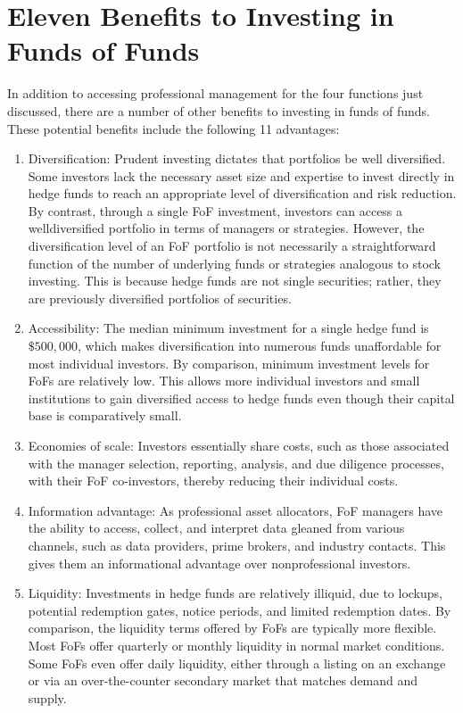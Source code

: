 \documentclass[11pt]{article}
\begin{document}
\section*{Eleven Benefits to Investing in Funds of Funds}
In addition to accessing professional management for the four functions just discussed, there are a number of other benefits to investing in funds of funds. These potential benefits include the following 11 advantages:

\begin{enumerate}
  \item Diversification: Prudent investing dictates that portfolios be well diversified. Some investors lack the necessary asset size and expertise to invest directly in hedge funds to reach an appropriate level of diversification and risk reduction. By contrast, through a single FoF investment, investors can access a welldiversified portfolio in terms of managers or strategies. However, the diversification level of an FoF portfolio is not necessarily a straightforward function of the number of underlying funds or strategies analogous to stock investing. This is because hedge funds are not single securities; rather, they are previously diversified portfolios of securities.

  \item Accessibility: The median minimum investment for a single hedge fund is $\$ 500,000$, which makes diversification into numerous funds unaffordable for most individual investors. By comparison, minimum investment levels for FoFs are relatively low. This allows more individual investors and small institutions to gain diversified access to hedge funds even though their capital base is comparatively small.

  \item Economies of scale: Investors essentially share costs, such as those associated with the manager selection, reporting, analysis, and due diligence processes, with their FoF co-investors, thereby reducing their individual costs.

  \item Information advantage: As professional asset allocators, FoF managers have the ability to access, collect, and interpret data gleaned from various channels, such as data providers, prime brokers, and industry contacts. This gives them an informational advantage over nonprofessional investors.

  \item Liquidity: Investments in hedge funds are relatively illiquid, due to lockups, potential redemption gates, notice periods, and limited redemption dates. By comparison, the liquidity terms offered by FoFs are typically more flexible. Most FoFs offer quarterly or monthly liquidity in normal market conditions. Some FoFs even offer daily liquidity, either through a listing on an exchange or via an over-the-counter secondary market that matches demand and supply.


\end{enumerate}
\end{document}
